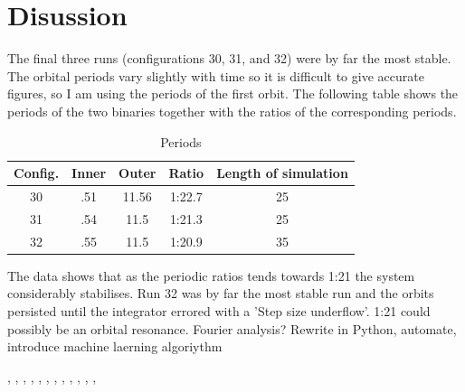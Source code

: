 \documentclass[a4paper,12pt]{article}
\begin{document}
\newpage
\section{Disussion}
The final three runs (configurations 30, 31, and 32) were by far the most stable. The orbital periods vary slightly with time so it is difficult to give accurate figures, so
I am using the periods of the first orbit. The following table shows the periods of the two binaries together with the ratios of the corresponding periods.
\begin{table}[ht!]
  \centering
  \caption{Periods}
  \label{tab:periods}
  \begin{tabular}{ccccc}
   Config. & Inner & Outer & Ratio & Length of simulation\\
    \hline
   30 & .51 & 11.56 & 1:22.7 & 25\\
   31 & .54 & 11.5 & 1:21.3 & 25\\
   32 & .55 & 11.5 & 1:20.9 & 35\\
  \end{tabular}
\end{table}
The data shows that as the periodic ratios tends towards 1:21 the system considerably stabilises. Run 32 was by far the most stable run and the orbits persisted until the integrator
errored with a 'Step size underflow'. 1:21 could possibly be an orbital resonance.
Fourier analysis?
Rewrite in Python, automate, introduce machine laerning algoriythm 

\citep{garzon}, \citep{erwin1}, \citep{macie1}, \citep{macie2}, \citep{macie3}, \citep{macie4}, \citep{macie5}
\citep{macie6}, \citep{macie7}, \citep{manos}, \citep{shen1}, \citep{shen2}, \citep{debattista}, \citep{malhotra}
\end{document}
